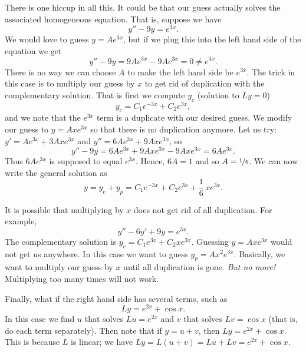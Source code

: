 \medskip

There is one hiccup in all this.  It could be that our guess actually
solves the associated homogeneous equation.  That is, suppose we have
\begin{equation*}
y'' - 9y = e^{3x} .
\end{equation*}
We would love to guess $y = Ae^{3x}$, but if we plug this into the left
hand side of the equation we get
\begin{equation*}
y''-9y = 9Ae^{3x} - 9Ae^{3x} = 0 \not= e^{3x} .
\end{equation*}
There is no way we can choose $A$ to make the left hand side be $e^{3x}$.
The trick in
this case
is to multiply our guess by $x$ to get rid of duplication with the
complementary solution.  That is first we compute $y_c$ (solution to $Ly =
0$)
\begin{equation*}
y_c = C_1 e^{-3x} + C_2 e^{3x} ,
\end{equation*}
and we note that the $e^{3x}$ term is a duplicate with our desired guess.
We modify our guess to $y = Axe^{3x}$ so that there is no
duplication anymore.  Let us try:
$y' = Ae^{3x} + 3Axe^{3x}$ and 
$y'' = 6Ae^{3x} + 9Axe^{3x}$, so
\begin{equation*}
y'' -9y = 6Ae^{3x} + 9Axe^{3x} - 9Axe^{3x} = 
6Ae^{3x} .
\end{equation*}
Thus $6Ae^{3x}$ is supposed to equal $e^{3x}$.  Hence,
$6A = 1$ and so $A=\nicefrac{1}{6}$.  We can now write the general
solution as
\begin{equation*}
y = y_c + y_p = 
C_1 e^{-3x} + C_2 e^{3x} + \frac{1}{6}\,xe^{3x} .
\end{equation*}

\medskip

It is possible that
multiplying by $x$ does not get rid of all
duplication.  For example,
\begin{equation*}
y''-6y'+9y = e^{3x} .
\end{equation*}
The complementary solution is
$y_c = C_1 e^{3x} + C_2 x e^{3x}$.  Guessing $y=A xe^{3x}$
would not get us anywhere.  In this case we want to guess
$y_p = Ax^2e^{3x}$. Basically, we want to multiply our guess by $x$
until all duplication is gone.  \emph{But no more!}  Multiplying too many
times will not work.

\medskip

Finally, what if the right hand side has several terms, such as
\begin{equation*}
Ly = e^{2x} + \cos x .
\end{equation*}
In this case we find $u$ that solves $Lu = e^{2x}$ and $v$ that
solves $Lv = \cos x$ (that is, do each term separately).  Then note
that if $y = u+ v$, then $Ly = e^{2x} + \cos x$.  This is because
$L$ is linear; we have
$Ly = L(u+v) = Lu + Lv = e^{2x} + \cos x$.

